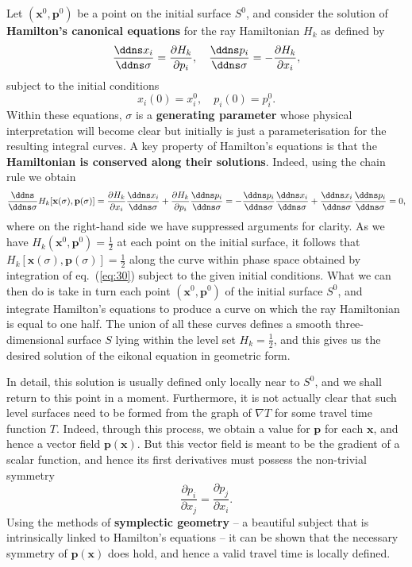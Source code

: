 Let $(\mathbf{x}^{0},\mathbf{p}^{0})$ be a point on the initial surface $S^{0}$, and consider the solution of 
\textbf{Hamilton's canonical equations} for the ray Hamiltonian $H_{k}$ as defined by
\begin{equation}
\frac{\ddns x_{i}}{\ddns\sigma}=\frac{\partial H_{k}}{\partial p_{i}}, \quad \frac{\ddns p_{i}}{\ddns\sigma}=-\frac{\partial H_{k}}{\partial x_{i}},
\label{eq:30}
\end{equation}
subject to the initial conditions
\begin{equation}
x_{i}(0)=x_{i}^{0}, \quad p_{i}(0)=p_{i}^{0}.
\label{eq:31}
\end{equation}
Within these equations, $\sigma$ is a \textbf{generating parameter} whose physical interpretation will become clear but 
initially is just a parameterisation for the resulting integral curves.
A key property of Hamilton's equations is that the \textbf{Hamiltonian is conserved along their solutions}. Indeed, using the chain rule we obtain
\begin{equation}
\frac{\ddns}{\ddns\sigma}H_{k}[\mathbf{x}(\sigma), \mathbf{p}(\sigma)]=\frac{\partial H_{k}}{\partial x_{i}}\frac{\ddns x_{i}}{\ddns\sigma}+\frac{\partial H_{k}}{\partial p_{i}}\frac{\ddns p_{i}}{\ddns\sigma} = -\frac{\ddns p_{i}}{\ddns\sigma}\frac{\ddns x_{i}}{\ddns\sigma}+\frac{\ddns x_{i}}{\ddns\sigma}\frac{\ddns p_{i}}{\ddns\sigma}=0,
\label{eq:32}
\end{equation}
where on the right-hand side we have suppressed arguments for clarity. As we have $H_{k}(\mathbf{x}^{0},\mathbf{p}^{0})=\frac{1}{2}$ at each point
 on the initial surface, it follows that $H_{k}[\mathbf{x}(\sigma), \mathbf{p}(\sigma)]=\frac{1}{2}$ along the 
curve within phase space obtained by integration of eq.~(\ref{eq:30}) subject to the given initial conditions. What we can then do is take in 
turn each point $(\mathbf{x}^{0},\mathbf{p}^{0})$ of the initial surface $S^{0}$, and integrate Hamilton's equations to produce a 
curve on which the ray Hamiltonian is equal to one half. The union of all these curves defines a smooth three-dimensional 
surface $S$ lying within the level set $H_{k}=\frac{1}{2}$, and this gives us the desired solution of the eikonal equation in geometric form. 

In detail, this 
solution is usually defined only locally near to $S^{0}$, and we shall return to this point in a moment. Furthermore, it is not 
actually clear that such level surfaces need to be formed from the graph of $\nabla T$ for some travel time function $T$. 
Indeed, through this process, we obtain a value for $\mathbf{p}$ for each $\mathbf{x}$, and hence a vector field 
$\mathbf{p}(\mathbf{x})$. But this vector field is meant to be the gradient of a scalar function, and hence  
its first derivatives must possess the non-trivial symmetry
\begin{equation}
    \frac{\partial p_{i}}{\partial x_{j}}=\frac{\partial p_{j}}{\partial x_{i}}.
\label{eq:33}
\end{equation}
Using the methods of \textbf{symplectic geometry} -- a beautiful subject that is intrinsically linked to Hamilton's equations -- 
it can be shown that the necessary symmetry of $\mathbf{p}(\mathbf{x})$ does hold, and hence a valid travel time is locally 
defined. 


